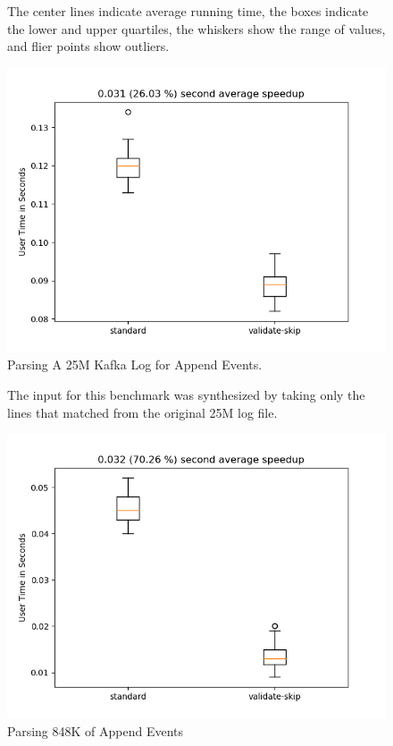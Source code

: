 \begin{figure}
\caption{Parsing A 25M Kafka Log for Append Events.}
\label{fig:append}

The center lines indicate average running time, the
boxes indicate the lower and upper quartiles, the whiskers show
the range of values, and flier points show outliers.

\includegraphics{resources/append.png}
\end{figure}

\begin{figure}
\caption{Parsing 848K of Append Events}
\label{fig:append:just:match}

The input for this benchmark was synthesized by taking
only the lines that matched from the original 25M log file.

\includegraphics{resources/append-just-match.png}
\end{figure}

